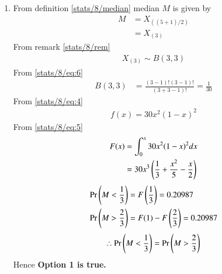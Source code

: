     \begin{enumerate}
     \item 
    From definition \eqref{stats/8/median} median $M$ is given by
    \begin{align}
      M &= X_{((5+1)/2)}\\
      &=X_{(3)}\label{stats/8/eq:m}
    \end{align}
    From remark \eqref{stats/8/rem} 
    \begin{align}
    X_{(3)} \sim B(3,3)
    \end{align}
    From \eqref{stats/8/eq:6}
    \begin{align}
        B(3,3)&=\frac{(3-1)!(3-1)!}{(3+3-1)!}=\frac{1}{30}
     \end{align}
     From \eqref{stats/8/eq:4}
     \begin{align}
         f(x)=30x^{2}(1-x)^{2}
     \end{align}
     From \eqref{stats/8/eq:5}
     \begin{align}
         F(x)&=\int_{0}^{x}30x^{2}(1-x)^{2}dx\\
         &=30x^{3}\left(\frac{1}{3}+\frac{x^2}{5}-\frac{x}{2}\right)
     \end{align}
     \begin{align}
         \Pr\left(M<\frac{1}{3}\right)&=F\left(\frac{1}{3}\right)=0.20987\\
         \Pr\left(M>\frac{2}{3}\right)&=F(1)-F\left(\frac{2}{3}\right)=0.20987
     \end{align}
     \begin{align}
          \therefore \Pr\left(M<\frac{1}{3}\right)=\Pr\left(M>\frac{2}{3}\right)
     \end{align}
      Hence \textbf{Option 1 is true.}
        
        
        

\end{enumerate}
